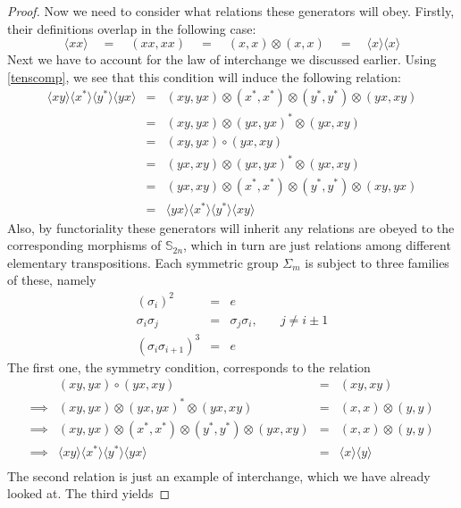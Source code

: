 \documentclass{amsbook} %
\numberwithin{section}{chapter}
\begin{document}
\begin{proof}
Now we need to consider what relations these generators will obey. Firstly, their definitions overlap in the following case:
\[ \langle xx \rangle \quad = \quad (xx,xx) \quad = \quad (x,x) \otimes (x,x) \quad = \quad \langle x \rangle\langle x \rangle \]
Next we have to account for the law of interchange we discussed earlier. Using \cref{tenscomp}, we see that this condition will induce the following relation:
\[ \begin{array}{rll}
			\langle xy \rangle \langle x^* \rangle \langle y^* \rangle \langle yx \rangle & = & (xy, yx) \otimes (x^*, x^*) \otimes (y^*, y^*) \otimes (yx, xy) \\
			& = & (xy, yx) \otimes (yx, yx)^* \otimes (yx, xy) \\
			& = & (xy,yx) \circ (yx, xy) \\
			& = & (yx, xy) \otimes (yx, yx)^* \otimes (yx, xy) \\
			& = & (yx, xy) \otimes (x^*, x^*) \otimes (y^*, y^*) \otimes (xy, yx) \\
			& = & \langle yx \rangle \langle x^* \rangle \langle y^* \rangle \langle xy \rangle
		\end{array}
\]
Also, by functoriality these generators will inherit any relations are obeyed to the corresponding morphisms of $\mathbb{S}_{2n}$, which in turn are just relations among different elementary transpositions. Each symmetric group $\Sigma_m$ is subject to three families of these, namely
\[ \begin{array}{rrll}
			(\sigma_i)^2 & = & e & \\
			\sigma_i \sigma_j & = & \sigma_j \sigma_i, & \quad j \neq i \pm 1 \\
			(\sigma_i \sigma_{i+1})^3 & = & e &
		\end{array}
\]
The first one, the symmetry condition, corresponds to the relation
\[ \begin{array}{rrll}
			& (xy, yx) \circ (yx, xy) & = & (xy, xy) \\
			\implies & (xy, yx) \otimes (yx, yx)^* \otimes (yx, xy) & = & (x, x) \otimes (y,y) \\
			\implies & (xy, yx) \otimes (x^*, x^*) \otimes (y^*, y^*)  \otimes (yx, xy) & = & (x, x) \otimes (y,y) \\
			\implies & \langle xy \rangle\langle x^* \rangle\langle y^* \rangle\langle yx \rangle & = & \langle x \rangle\langle y \rangle \\
		\end{array}
\]
The second relation is just an example of interchange, which we have already looked at. The third yields

\end{proof}
\end{document}
